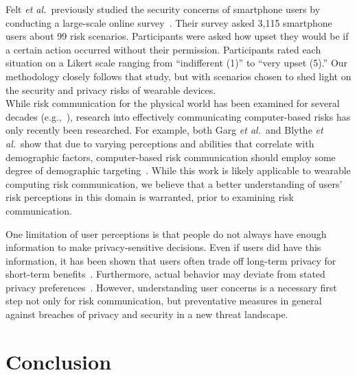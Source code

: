 \documentclass{sig-alternate-hotpets15}
\def\etal{{\it et al.~}}
\begin{document}
Felt \etal previously studied the security concerns of smartphone users by conducting a large-scale online survey~\cite{Felt}. Their survey asked 3,115 smartphone users about 99 risk scenarios. Participants were asked how upset they would be if a certain action occurred without their permission. Participants rated each situation on a Likert scale ranging from ``indifferent (1)'' to ``very upset (5).'' Our methodology closely follows that study, but with scenarios chosen to shed light on the security and privacy risks of wearable devices.\\

 While risk communication for the physical world has been examined for several decades (e.g.,~\cite{Fischhoff,Morgan2001}), research into effectively communicating computer-based risks has only recently been researched. For example, both Garg {\it et al.}\ and Blythe {\it et al.}\ show that due to varying perceptions and abilities that correlate with demographic factors, computer-based risk communication should employ some degree of demographic targeting~\cite{Garg2012,Blythe2011}. While this work is likely applicable to wearable computing risk communication, we believe that a better understanding of users' risk perceptions in this domain is warranted, prior to examining risk communication.

One limitation of user perceptions is that people do not always have enough information to make privacy-sensitive decisions. Even if users did have this information, it has been shown that users often trade off long-term privacy for short-term benefits~\cite{acquisti2005privacy}. Furthermore, actual behavior may deviate from stated privacy preferences~\cite{spiekermann2001privacy}. However, understanding user concerns is a necessary first step not only for risk communication, but preventative measures in general against breaches of privacy and security in a new threat landscape. 

\section{Conclusion}
\end{document}
